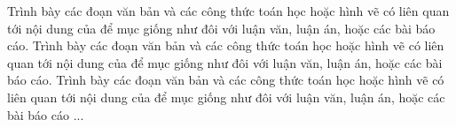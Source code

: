 Trình bày các đoạn văn bản và các công thức toán học hoặc hình vẽ có liên quan tới nội dung của để mục giống như đôi với luận văn, luận án, hoặc các bài báo cáo. Trình bày các đoạn văn bản và các công thức toán học hoặc hình vẽ có liên quan tới nội dung của để mục giống như đôi với luận văn, luận án, hoặc các bài báo cáo. Trình bày các đoạn văn bản và các công thức toán học hoặc hình vẽ có liên quan tới nội dung của để mục giống như đôi với luận văn, luận án, hoặc các bài báo cáo ... 